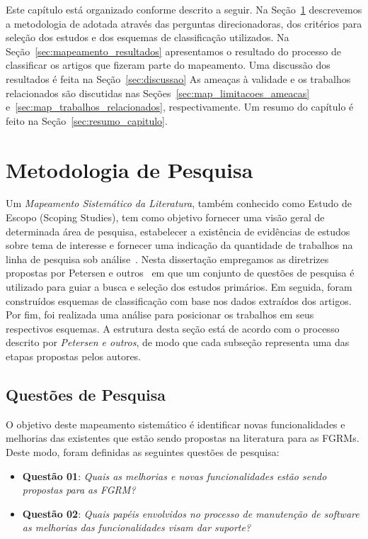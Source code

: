 Este capítulo está organizado conforme descrito a seguir. Na
Seção~\ref{sec:map-metodologia} descrevemos a metodologia de adotada através das
perguntas direcionadoras, dos critérios para seleção dos estudos e dos esquemas
de classificação utilizados. Na Seção~\ref{sec:mapeamento_resultados}
apresentamos o resultado do processo de classificar os artigos que fizeram parte
do mapeamento. Uma discussão dos resultados é feita na Seção~\ref{sec:discussao}
As ameaças à validade e os trabalhos relacionados são discutidas nas
Seções~\ref{sec:map_limitacoes_ameacas} e~\ref{sec:map_trabalhos_relacionados},
respectivamente. Um resumo do capítulo é feito na
Seção~\ref{sec:resumo_capitulo}.

\section{Metodologia de Pesquisa}
\label{sec:map-metodologia}

Um \textit{Mapeamento Sistemático da Literatura}, também conhecido como Estudo
de Escopo (Scoping Studies), tem como objetivo fornecer uma visão geral de
determinada área de pesquisa, estabelecer a existência de evidências de estudos
sobre tema de interesse e fornecer uma indicação da quantidade de trabalhos na
linha de pesquisa sob
análise~\cite{keele2007guidelines,wohlin2012experimentation}.  Nesta dissertação
empregamos as diretrizes propostas por Petersen e outros~\cite{Petersen2008} em
que um conjunto de questões de pesquisa é utilizado para guiar a busca e seleção
dos estudos primários. Em seguida, foram construídos esquemas de classificação
com base nos dados extraídos dos artigos. Por fim, foi realizada uma análise
para posicionar os trabalhos em seus respectivos esquemas. A estrutura desta
seção está de acordo com o processo descrito por \textit{Petersen e outros}, de
modo que cada subseção representa uma das etapas propostas pelos autores.

\subsection{Questões de Pesquisa}
\label{subsec:map-questoes-de-pesquisa}

O objetivo deste mapeamento sistemático é identificar novas funcionalidades e
melhorias das existentes que estão sendo propostas na literatura para as FGRMs.
Deste modo, foram definidas as seguintes questões de pesquisa:

\begin{itemize}
	\item \textbf{Questão 01}: \textit{Quais as melhorias e novas
			funcionalidades estão sendo propostas para as FGRM?}
	\item \textbf{Questão 02}: \textit{Quais papéis envolvidos no processo de
			manutenção de software as melhorias das funcionalidades visam dar
			suporte?}
\end{itemize}

